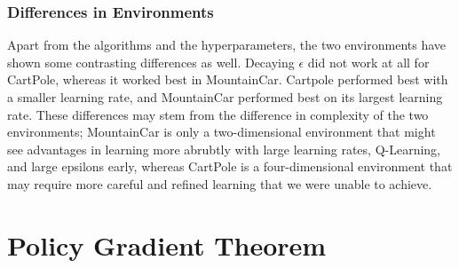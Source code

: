 \documentclass{article}
\begin{document}
\subsubsection{Differences in Environments}
Apart from the algorithms and the hyperparameters, the two environments have shown some
contrasting differences as well. Decaying $\epsilon$ did not work at all for CartPole, whereas
it worked best in MountainCar. Cartpole performed best with a smaller learning rate, and
MountainCar performed best on its largest learning rate. These differences may stem from the
difference in complexity of the two environments; MountainCar is only a two-dimensional environment
that might see advantages in learning more abrubtly with large learning rates, Q-Learning, and large epsilons early, whereas CartPole is a four-dimensional environment
that may require more careful and refined learning that we were unable to achieve.

\section{Policy Gradient Theorem}
\end{document}
